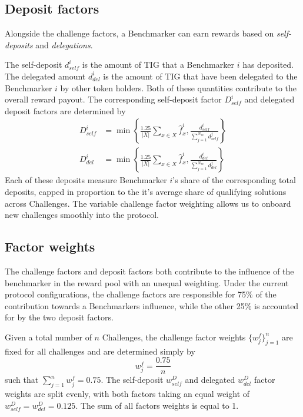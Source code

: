 \documentclass{contract}
\def\f{\hat{f}}
\numberwithin{equation}{section}
\begin{document}
\subsection{Deposit factors}
\label{sec:deposit-factors}
Alongside the challenge factors, a Benchmarker can earn rewards based on \emph{self-deposits} and \emph{delegations}. 

The self-deposit $d^i_{self}$ is the amount of TIG that a Benchmarker $i$ has deposited.
The delegated amount $d^i_{del}$ is the amount of TIG that have been delegated to the Benchmarker $i$ by other token holders. 
Both of these quantities contribute to the overall reward payout.
The corresponding self-deposit factor $D^i_{self}$ and delegated deposit factors are determined by
\begin{align}
    D^i_{self} &= \min\left\lbrace
    \frac{1.25}{|X|}\sum_{x\in X} \hat{f}^i_x, \frac{d^i_{self}}{\sum_{j=1}^{N_m} d^j_{self}}\right\rbrace\\
    D^i_{del} &= \min\left\lbrace \frac{1.25}{|X|}\sum_{x\in X} \hat{f}^i_x, \frac{d^i_{del}}{\sum_{j=1}^{N_m} d^j_{del}}\right\rbrace
\end{align}
Each of these deposits measure Benchmarker $i$'s share of the corresponding total deposits, capped in proportion to the it's average share of qualifying solutions across Challenges.
The variable challenge factor weighting allows us to onboard new challenges smoothly into the protocol.


\subsection{Factor weights}

The challenge factors and deposit factors both contribute to the influence of the benchmarker in the reward pool with an unequal weighting. 
Under the current protocol configurations, the challenge factors are responsible for 75\% of the contribution towards a Benchmarkers influence, while the other 25\% is accounted for by the two deposit factors.

Given a total number of $n$ Challenges, the challenge factor weights $\lbrace w_j^f\rbrace_{j=1}^{n}$ are fixed for all challenges and are determined simply by 
\begin{equation}
    w_j^f = \frac{0.75}{n}
\end{equation}
such that $\sum_{j=1}^{n}w_j^f = 0.75$. The self-deposit $w^{D}_{self}$ and delegated $w^D_{del}$ factor weights are split evenly, with both factors taking an equal weight of $w^D_{self} = w^D_{del} = 0.125$.
The sum of all factors weights is equal to 1. 
\end{document}
